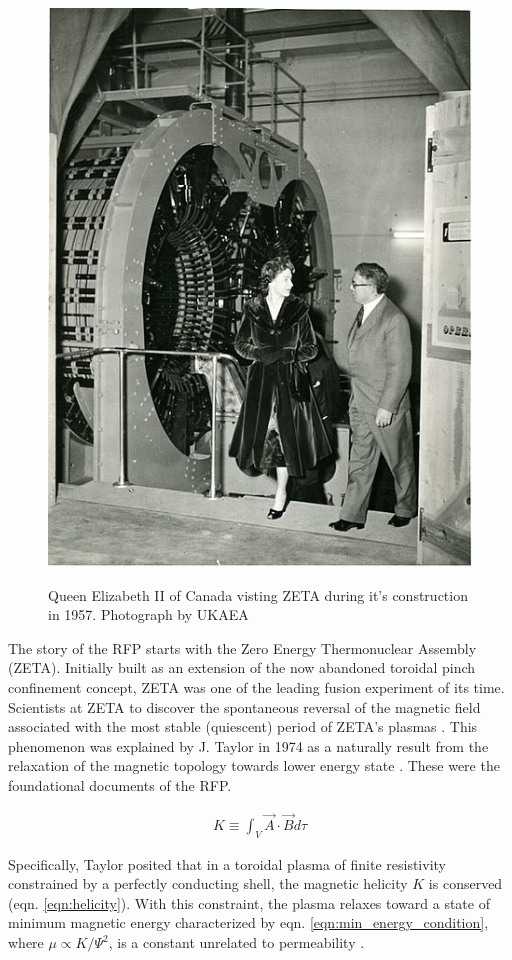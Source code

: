 \begin{refsection}
\begin{figure}[!htb]
	\centering
	\includegraphics[width = 0.75\linewidth]{./1_Introduction/queen_at_zeta.jpg}
    \label{fig:Queen_at_ZETA}
    \caption[Queen Elizabeth II at the ZETA experiment]{Queen Elizabeth II of Canada visting ZETA during it's construction in 1957. Photograph by UKAEA}
\end{figure}%

The story of the RFP starts with the Zero Energy Thermonuclear Assembly (ZETA). Initially built as an extension of the now abandoned toroidal pinch confinement concept, ZETA was one of the leading fusion experiment of its time. Scientists at ZETA to discover the spontaneous reversal of the magnetic field associated with the most stable (quiescent) period of ZETA's plasmas \cite{Butt1966,Robinson1969}. This phenomenon was explained by J. Taylor in 1974 as a naturally result from the relaxation of the magnetic topology towards lower energy state \cite{Taylor1974}. These were the foundational documents of the RFP.

\begin{align}\label{eqn:helicity}
	K \equiv \int_{V} \vec{A} \cdot \vec{B} d\tau
\end{align}

Specifically, Taylor posited that in a toroidal plasma of finite resistivity constrained by a perfectly conducting shell, the magnetic helicity $K$ is conserved (eqn. \ref{eqn:helicity}). With this constraint, the plasma relaxes toward a state of minimum magnetic energy characterized by eqn. \ref{eqn:min_energy_condition}, where $\mu \varpropto K/ \Psi ^2$, is a constant unrelated to permeability . 


\end{refsection}
